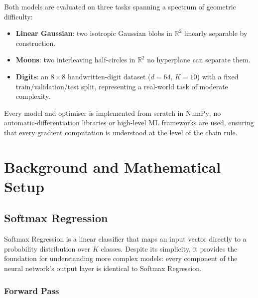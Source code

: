 \documentclass[11pt]{article}
\newcommand{\R}{\mathbb{R}}
\begin{document}
Both models are evaluated on three tasks spanning a spectrum of geometric difficulty:
\begin{itemize}[leftmargin=1.4em,itemsep=0.15em]
  \item \textbf{Linear Gaussian}: two isotropic Gaussian blobs in $\R^2$ linearly separable
        by construction.
  \item \textbf{Moons}: two interleaving half-circles in $\R^2$ no hyperplane can separate
        them.
  \item \textbf{Digits}: an $8{\times}8$ handwritten-digit dataset ($d{=}64$, $K{=}10$) with a
        fixed train/validation/test split, representing a real-world task of moderate complexity.
\end{itemize}

Every model and optimiser is implemented from scratch in NumPy; no automatic-differentiation
libraries or high-level ML frameworks are used, ensuring that every gradient computation is
understood at the level of the chain rule.

\section{Background and Mathematical Setup}
\label{sec:background}

\subsection{Softmax Regression}
\label{sec:softmax}

Softmax Regression is a linear classifier that maps an input vector directly to a probability distribution over $K$ classes. Despite its simplicity, it provides the foundation for understanding more complex models: every component of the neural network's output layer is identical to Softmax Regression.

\subsubsection*{Forward Pass}
\end{document}
